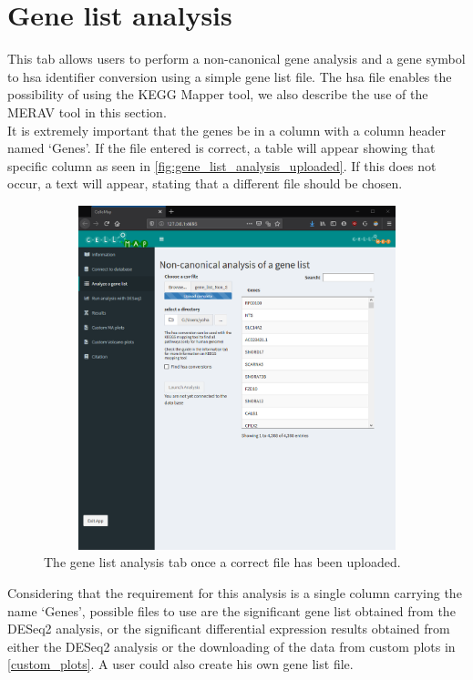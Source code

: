 \documentclass[11pt]{article}
\begin{document}
\section{Gene list analysis \label{gene_list_analysis}}
This tab allows users to perform a non-canonical gene analysis and a gene symbol to \acrshort{hsa} identifier conversion using a simple gene list file. The \acrshort{hsa} file enables the possibility of using the \acrshort{KEGG} Mapper tool, we also describe the use of the \acrshort{MERAV} tool in this section.\\
It is extremely important that the genes be in a column with a column header named `Genes'. If the file entered is correct, a table will appear showing that specific column as seen in \autoref{fig:gene_list_analysis_uploaded}. If this does not occur, a text will appear, stating that a different file should be chosen.
\begin{figure}[h!]
\centering
\includegraphics[width=15cm,height=10cm,keepaspectratio]{gene_list_analysis.png}
\caption{The gene list analysis tab once a correct file has been uploaded.}
\label{fig:gene_list_analysis_uploaded}
\end{figure}

Considering that the requirement for this analysis is a single column carrying the name `Genes', possible files to use are the significant gene list obtained from the \acrshort{DESeq2} analysis, or the significant differential expression results obtained from either the \acrshort{DESeq2} analysis or the downloading of the data from custom plots in \autoref{custom_plots}. A user could also create his own gene list file.
\end{document}
